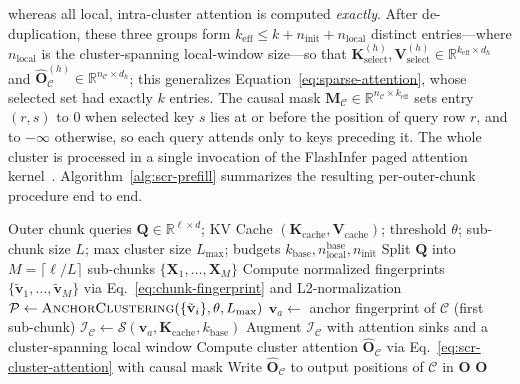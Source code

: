 \documentclass[10pt,conference]{IEEEtran}
\begin{document}
whereas all local, intra-cluster attention is computed \emph{exactly}.
After de-duplication, these three groups form
$k_{\text{eff}} \leq k + n_{\text{init}} + n_{\text{local}}$ distinct
entries---where $n_{\text{local}}$ is the cluster-spanning local-window
size---so that
$\mathbf{K}^{(h)}_{\text{select}}, \mathbf{V}^{(h)}_{\text{select}} \in \mathbb{R}^{k_{\text{eff}} \times d_h}$
and $\hat{\mathbf{O}}_{\mathcal{C}}^{(h)} \in \mathbb{R}^{n_{\mathcal{C}} \times d_h}$;
this generalizes Equation~\eqref{eq:sparse-attention}, whose selected set
had exactly $k$ entries. The causal mask
$\mathbf{M}_{\mathcal{C}} \in \mathbb{R}^{n_{\mathcal{C}} \times k_{\text{eff}}}$
sets entry $(r,s)$ to $0$ when selected key $s$ lies at or before the
position of query row $r$, and to $-\infty$ otherwise, so each query
attends only to keys preceding it. The whole cluster is processed in a
single invocation of the FlashInfer paged attention
kernel~\cite{ye2025flashinfer}. Algorithm~\ref{alg:scr-prefill}
summarizes the resulting per-outer-chunk procedure end to end.

\begin{algorithm}[t]
\caption{Similarity Chunk Rolling for one outer chunk.}
\label{alg:scr-prefill}
\begin{algorithmic}[1]
\Require Outer chunk queries $\mathbf{Q} \in \mathbb{R}^{\ell \times d}$; KV Cache $(\mathbf{K}_{\text{cache}}, \mathbf{V}_{\text{cache}})$; threshold $\theta$; sub-chunk size $L$; max cluster size $L_{\max}$; budgets $k_{\text{base}}, n_{\text{local}}^{\text{base}}, n_{\text{init}}$
\State Split $\mathbf{Q}$ into $M = \lceil \ell / L \rceil$ sub-chunks $\{\mathbf{X}_1, \ldots, \mathbf{X}_M\}$
\State Compute normalized fingerprints $\{\tilde{\mathbf{v}}_1, \ldots, \tilde{\mathbf{v}}_M\}$ via Eq.~\eqref{eq:chunk-fingerprint} and L2-normalization
\State $\mathcal{P} \gets \textsc{AnchorClustering}(\{\tilde{\mathbf{v}}_i\}, \theta, L_{\max})$ 
    \State $\mathbf{v}_a \gets$ anchor fingerprint of $\mathcal{C}$ (first sub-chunk)
    \State $\mathcal{I}_{\mathcal{C}} \gets \mathcal{S}(\mathbf{v}_a, \mathbf{K}_{\text{cache}}, k_{\text{base}})$ 
    \State Augment $\mathcal{I}_{\mathcal{C}}$ with attention sinks and a cluster-spanning local window
    \State Compute cluster attention $\hat{\mathbf{O}}_{\mathcal{C}}$ via Eq.~\eqref{eq:scr-cluster-attention} with causal mask
    \State Write $\hat{\mathbf{O}}_{\mathcal{C}}$ to output positions of $\mathcal{C}$ in $\mathbf{O}$
\EndFor
\State \Return $\mathbf{O}$
\end{algorithmic}
\end{algorithm}
\end{document}
